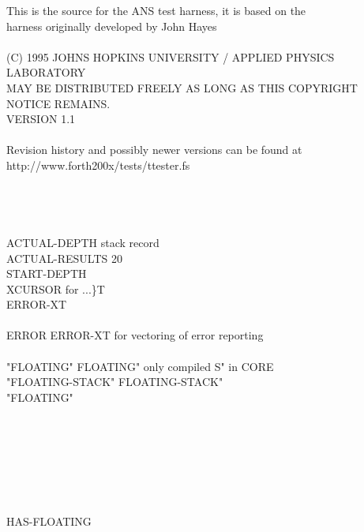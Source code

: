 \frenchspacing
\obeyspaces
\begin{tt}
 This is the source for the ANS test harness, it is based on the\\
 harness originally developed by John Hayes\\
\\
 (C) 1995 JOHNS HOPKINS UNIVERSITY / APPLIED PHYSICS LABORATORY\\
 MAY BE DISTRIBUTED FREELY AS LONG AS THIS COPYRIGHT NOTICE REMAINS.\\
 VERSION 1.1\\
\\
 Revision history and possibly newer versions can be found at\\
 http://www.forth200x/tests/ttester.fs\\
\\
  \\
 \\
\\
 ACTUAL-DEPTH          stack record \\
 ACTUAL-RESULTS 20   \\
 START-DEPTH \\
 XCURSOR               for ...\}T \\
 ERROR-XT \\
\\
\word{:} ERROR ERROR-XT   \word{;}   for vectoring of error reporting \\
\\
\word{:} "FLOATING"  FLOATING" \word{;}    only compiled S" in CORE \\
\word{:} "FLOATING-STACK"  FLOATING-STACK" \word{;} \\
"FLOATING"  \word[tools]{[IF]} \\
\tab \word[tools]{[IF]} \\
\tab[2]  \\
\tab \word[tools]{[ELSE]} \\
\tab[2]  \\
\tab \word[tools]{[THEN]} \\
\word[tools]{[ELSE]} \\
\tab {} \\
\word[tools]{[THEN]}  HAS-FLOATING \\

\end{tt}
